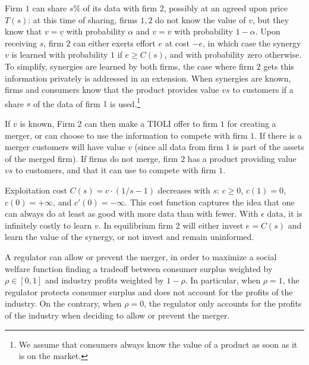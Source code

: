 \documentclass[a4paper,leqno]{article}%
\renewcommand{\a}{\alpha}
\newcommand{\uv}{\underline{v}}
\newcommand{\ov}{\overline{v}}
\begin{document}
Firm $1$ can share $s\%$ of its data with firm $2$, possibly at an agreed upon price $T(s)$: at this time of sharing, firms $1,2$ do not know the value of $v$, but they know that $v=\uv$ with probability $\a$ and $v=\ov$ with probability $1-\a$. Upon receiving $s$, firm $2$ can either exerts effort $e$ at cost $-e$, in which case the synergy $v$ is learned with probability $1$ if $e\geq C(s)$, and with probability zero otherwise. To simplify, synergies are learned by both firms, the case where firm $2$ gets this information privately is addressed in an extension. When synergies are known, firms and consumers know that the product provides value $v s$ to customers if a share $s$ of the data of firm $1$ is used.\footnote{We assume that consumers always know the value of a product as soon as it is on the market.} 


If $v$ is known, Firm 2 can then make a TIOLI offer to firm $1$ for creating a merger, or can choose to use the information to compete with firm $1$. If there is a merger customers will have value $v$ (since all data from firm $1$ is part of the assets of the merged firm). If firms do not merge, firm $2$ has a product providing value $vs$ to customers, and that it can use to compete with firm $1$.

Exploitation cost $C(s)=c\cdot(1/s-1)$ decreases with $s$: $c\geq 0$, $c(1)=0$, $c(0)=+\infty$, and $c'(0)=-\infty$. This cost function captures the idea that one can always do at least as good with more data than with fewer. With $\epsilon$ data, it is infinitely costly to learn $v$. In equilibrium firm 2 will either invest $e=C(s)$ and learn the value of the synergy, or not invest and remain uninformed.


A regulator can allow or prevent the merger, in order to maximize a social welfare function finding a tradeoff between consumer surplus weighted by $\rho\in[0,1]$ and industry profits weighted by $1-\rho$. In particular, when $\rho=1$, the regulator protects consumer surplus and does not account for the profits of the industry. On the contrary, when $\rho=0$, the regulator only accounts for the profits of the industry when deciding to allow or prevent the merger. 
\end{document}
